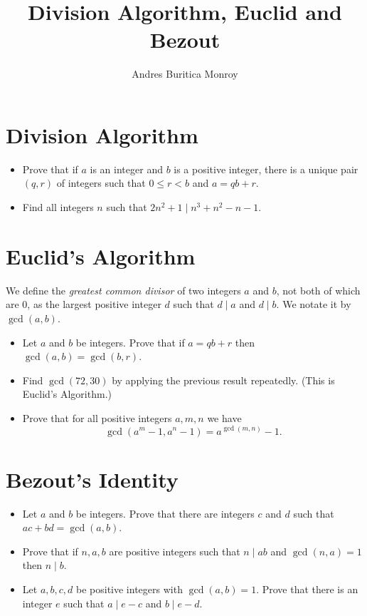 \documentclass{article}
\title{Division Algorithm, Euclid and Bezout}
\author{Andres Buritica Monroy}
\date{}
\begin{document}
\maketitle
\section{Division Algorithm}
\begin{itemize}
	\item Prove that if $a$ is an integer and $b$ is a positive integer, there
	      is a unique pair $(q,r)$ of integers such that $0\le r<b$ and $a=qb+r$.
	\item Find all integers $n$ such that $2n^2+1\mid n^3+n^2-n-1$.
\end{itemize}
\section{Euclid's Algorithm}
We define the \emph{greatest common divisor} of two integers $a$ and $b$, not
both of which are 0, as the largest positive integer $d$ such that $d\mid a$
and $d\mid b$. We notate it by $\gcd(a,b)$.
\begin{itemize}
	\item Let $a$ and $b$ be integers. Prove that if $a=qb+r$ then
	      $\gcd(a,b)=\gcd(b,r)$.
	\item Find $\gcd(72,30)$ by applying the previous result repeatedly. (This
	      is Euclid's Algorithm.)
	\item Prove that for all positive integers $a,m,n$ we have
	      \[\gcd(a^m-1,a^n-1)=a^{\gcd(m,n)}-1.\]
\end{itemize}
\section{Bezout's Identity}
\begin{itemize}
	\item Let $a$ and $b$ be integers. Prove that there are integers $c$ and $d$
	      such that $ac+bd=\gcd(a,b)$.
	\item Prove that if $n,a,b$ are positive integers such that $n\mid ab$ and
	      $\gcd(n,a)=1$ then $n\mid b$.
	\item Let $a,b,c,d$ be positive integers with $\gcd(a,b)=1$. Prove that there is an integer $e$
	      such that $a\mid e-c$ and $b\mid e-d$.
\end{itemize}
\newpage
\end{document}
